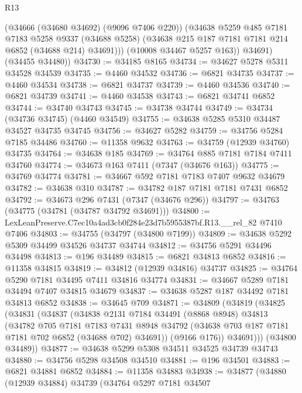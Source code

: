 \begin{lexlean}{R13}
\begin{coremodule}
            (@34666 (@34680 @34692) (@9096 @7406 @220))
            (@34638
              @5259
              @485
              @7181
              @7183
              @5258
              @9337
              (@34688 @5258)
              (@34638 @215 @187 @7181 @7181 @214 @6852 (@34688 @214) @34691)))
          (@10008 @34467 @5257 @163))
        @34691)
      (@34455 @34480))
@34730 := @34185 @8165
@34734 := @34627 @5278 @5311 @34528 @34539
@34735 := @4460 @34532
@34736 := @6821 @34735
@34737 := @4460 @34534
@34738 := @6821 @34737
@34739 := @4460 @34536
@34740 := @6821 @34739
@34741 := @4460 @34538
@34743 := @6821 @34741 @6852
@34744 := @34740 @34743
@34745 := @34738 @34744
@34749 := @34734 (@34736 @34745) (@4460 @34549)
@34755 := @34638 @5285 @5310 @34487 @34527 @34735 @34745
@34756 := @34627 @5282
@34759 := @34756 @5284 @7185 @34486
@34760 := @11358 @9632
@34763 := @34759 (@12939 @34760) @34735
@34764 := @34638 @185
@34769 := @34764 @885 @7181 @7184 @7411 @34760
@34774 := @34673 @163 @7411 (@7347 (@34676 @163))
@34775 := @34769 @34774
@34781 := @34667 @592 @7181 @7183 @7407 @9632 @34679
@34782 := @34638 @310
@34787 := @34782 @187 @7181 @7181 @7431 @6852
@34792 := @34673 @296 @7431 (@7347 (@34676 @296))
@34797 := @34763 (@34775 (@34781 (@34787 @34792 @34691)))
@34800 := LexLeanPreserve.C7ec10a4ad3cb0f284e23d7b5955387bf.R13.__rel_82 @7410 @7406
@34803 := @34755 (@34797 (@34800 @7199))
@34809 := @34638 @5292 @5309 @34499 @34526 @34737 @34744
@34812 := @34756 @5291 @34496 @34498
@34813 := @196 @34489
@34815 := @6821 @34813 @6852
@34816 := @11358 @34815
@34819 := @34812 (@12939 @34816) @34737
@34825 := @34764 @5290 @7181 @34495 @7411 @34816 @34774
@34831 := @34667 @5289 @7181 @34494 @7407 @34815 @34679
@34837 := @34638 @5287 @187 @34492 @7181 @34813 @6852
@34838 := @34645 @709
@34871 := @34809
    (@34819
      (@34825
        (@34831
          (@34837
            (@34838
              @2131
              @7184
              @34491
              (@8868 @8948)
              @34813
              (@34782
                @705
                @7181
                @7183
                @7431
                @8948
                @34792
                (@34638 @703 @187 @7181 @7181 @702 @6852 (@34688 @702) @34691))
              (@9166 @176))
            @34691)))
      (@34800 @34489))
@34877 := @34638 @5299 @5308 @34511 @34525 @34739 @34743
@34880 := @34756 @5298 @34508 @34510
@34881 := @196 @34501
@34883 := @6821 @34881 @6852
@34884 := @11358 @34883
@34938 := @34877
    (@34880
      (@12939 @34884)
      @34739
      (@34764
        @5297
        @7181
        @34507

\end{coremodule}
\end{lexlean}
